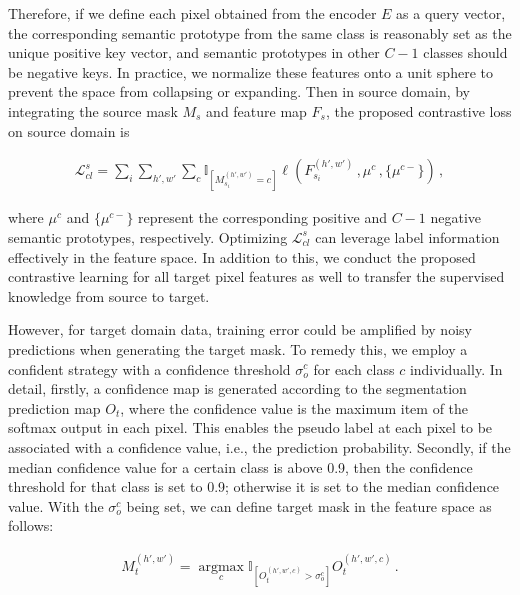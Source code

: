 \documentclass[runningheads]{llncs}
\newcommand{\Lm}{\mathcal{L}}
\begin{document}
Therefore, if we define each pixel obtained from the encoder $E$ as a query vector, the corresponding semantic prototype from the same class is reasonably set as the unique positive key vector, and semantic prototypes in other $C-1$ classes should be negative keys. In practice, we normalize these features onto a unit sphere to prevent the space from collapsing or expanding. Then in source domain, by integrating the source mask $M_s$ and feature map $F_{s}$, the proposed contrastive loss on source domain is
 \begin{small}
    \begin{align}
        \Lm_{cl}^s = \sum_i\sum_{h',w'} \sum_{c} \mathbb{I}_{[M_{s_i}^{(h',w')}=c]} \ell({F_{s_i}^{(h',w')}\,,\mu^{c}\,,\{\mu^{c-}\}})\,,
        \label{eq:source_local_loss}
    \end{align}
\end{small}where $\mu^{c}$ and $\{\mu^{c-}\}$ represent the corresponding positive and $C-1$ negative semantic prototypes, respectively.
Optimizing $\Lm_{cl}^s$ can leverage label information effectively in the feature space. In addition to this, we conduct the proposed contrastive learning for all target pixel features as well to transfer the supervised knowledge from source to target.


However, for target domain data, training error could be amplified by noisy predictions when generating the target mask. To remedy this, we employ a confident strategy with a confidence threshold $\sigma_o^c$ for each class $c$ individually. In detail, firstly, a confidence map is generated according to the segmentation prediction map $O_t$, where the confidence value is the maximum item of the softmax output in each pixel. This enables the pseudo label at each pixel to be associated with a confidence value, i.e., the prediction probability. Secondly, if the median confidence value for a certain class is above 0.9, then the confidence threshold for that class is set to 0.9; otherwise it is set to the median confidence value. With the $\sigma_o^c$ being set, we can define target mask in the feature space as follows:
 \begin{small}
    \begin{align}
        M_t^{(h',w')} = \mathop{\arg\max}\limits_{c} \mathbb{I}_{[O_t^{(h',w',c)}>\sigma_o^c]} O_t^{(h',w',c)}\,.
        \label{eq:target_mask}
    \end{align}
\end{small}
\end{document}
